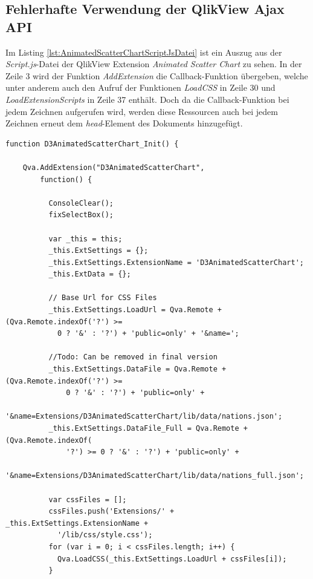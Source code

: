 \begin{appendix}
\newpage
\subsection{Fehlerhafte Verwendung der QlikView Ajax API} 
\label{lab:FehlerhafteVerwendungDerQlikViewAjaxAPI} 

Im Listing \ref{lst:AnimatedScatterChartScriptJsDatei} ist ein Auszug aus der \textit{Script.js}-Datei der QlikView Extension \textit{Animated Scatter Chart} zu sehen. In der Zeile 3 wird der Funktion \textit{AddExtension} die Callback-Funktion übergeben, welche unter anderem auch den Aufruf der Funktionen \textit{LoadCSS} in Zeile 30 und \textit{LoadExtensionScripts} in Zeile 37 enthält. Doch da die Callback-Funktion bei jedem Zeichnen aufgerufen wird, werden diese Ressourcen auch bei jedem Zeichnen erneut dem \textit{head}-Element des Dokuments hinzugefügt.

\ifIncludeFigures\begin{listing}[htbp]
\begin{verbatim}
function D3AnimatedScatterChart_Init() {

    Qva.AddExtension("D3AnimatedScatterChart",
        function() {

          ConsoleClear();
          fixSelectBox();

          var _this = this;
          _this.ExtSettings = {};
          _this.ExtSettings.ExtensionName = 'D3AnimatedScatterChart';
          _this.ExtData = {};

          // Base Url for CSS Files
          _this.ExtSettings.LoadUrl = Qva.Remote + (Qva.Remote.indexOf('?') >=
            0 ? '&' : '?') + 'public=only' + '&name=';

          //Todo: Can be removed in final version
          _this.ExtSettings.DataFile = Qva.Remote + (Qva.Remote.indexOf('?') >=
              0 ? '&' : '?') + 'public=only' +
            '&name=Extensions/D3AnimatedScatterChart/lib/data/nations.json';
          _this.ExtSettings.DataFile_Full = Qva.Remote + (Qva.Remote.indexOf(
              '?') >= 0 ? '&' : '?') + 'public=only' +
            '&name=Extensions/D3AnimatedScatterChart/lib/data/nations_full.json';

          var cssFiles = [];
          cssFiles.push('Extensions/' + _this.ExtSettings.ExtensionName +
            '/lib/css/style.css');
          for (var i = 0; i < cssFiles.length; i++) {
            Qva.LoadCSS(_this.ExtSettings.LoadUrl + cssFiles[i]);
          }


\end{verbatim}
\end{listing}
\end{appendix}
